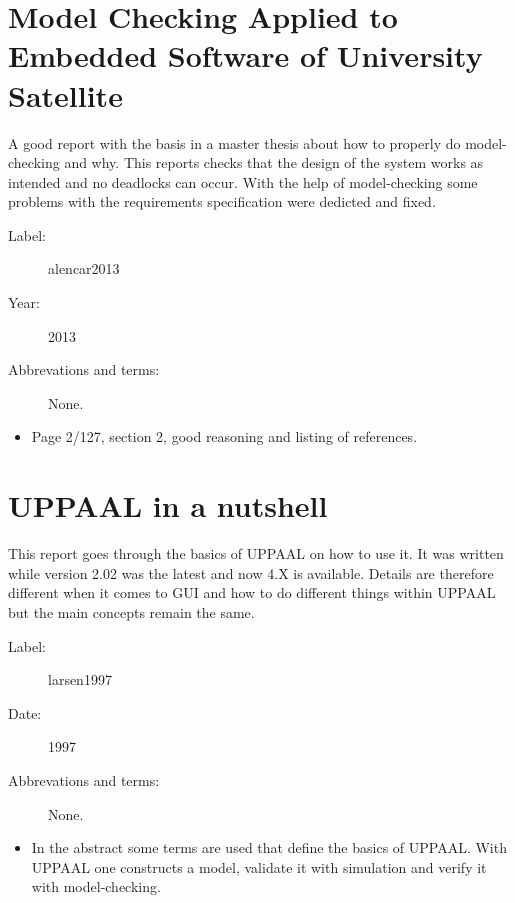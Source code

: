 \section{Model Checking Applied to Embedded Software of University Satellite}

A good report with the basis in a master thesis about how to properly do
model-checking and why. This reports checks that the design of the system
works as intended and no deadlocks can occur. With the help of model-checking
some problems with the requirements specification were dedicted and fixed.

\begin{description}
    \item[Label:] alencar2013 \cite{alencar2013}
    \item[Year:] 2013
    \item[Abbrevations and terms:] None.
\end{description}

\begin{itemize}
    \item Page 2/127, section 2, good reasoning and listing of references.
\end{itemize}

\section{UPPAAL in a nutshell}
This report goes through the basics of UPPAAL on how to use it. It was written
while version 2.02 was the latest and now 4.X is available. Details are
therefore different when it comes to GUI and how to do different things within
UPPAAL but the main concepts remain the same.

\begin{description}
    \item[Label:] larsen1997 \cite{larsen1997}
    \item[Date:] 1997
    \item[Abbrevations and terms:] None.
\end{description}

\begin{itemize}
    \item In the abstract some terms are used that define the basics of UPPAAL.
        With UPPAAL one constructs a model, validate it with simulation and
        verify it with model-checking.
\end{itemize}

